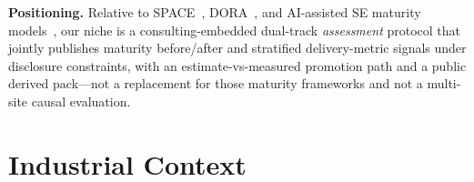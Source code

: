 \documentclass[10pt,conference]{IEEEtran}
\begin{document}
\textbf{Positioning.} Relative to SPACE~\cite{Forsgren2021SPACE}, DORA~\cite{Forsgren2018Accelerate}, and AI-assisted SE maturity models~\cite{Tereci2026AASD,Garousi2025AI4SEMM,Anderson2026ACMM}, our niche is a consulting-embedded dual-track \emph{assessment} protocol that jointly publishes maturity before/after and stratified delivery-metric signals under disclosure constraints, with an estimate-vs-measured promotion path and a public derived pack---not a replacement for those maturity frameworks and not a multi-site causal evaluation.

\section{Industrial Context}
\label{sec:context}
\end{document}
